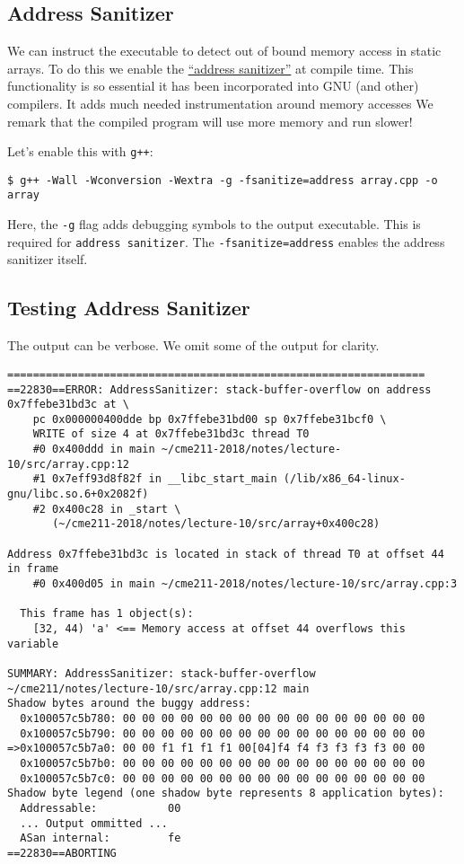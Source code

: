 \documentclass[12pt,letterpaper,twoside]{article}
\begin{document}
\subsection{Address Sanitizer}
We can instruct the executable to detect out of bound memory access in
static arrays. To do this we enable the
\href{https://en.wikipedia.org/wiki/AddressSanitizer}{``address
  sanitizer''} at compile time. This functionality is so essential it has been incorporated into GNU (and other) compilers.
It adds much needed instrumentation around memory accesses
We remark that the compiled program will use more memory and run slower!

Let's enable this with \texttt{g++}:

\begin{verbatim}
$ g++ -Wall -Wconversion -Wextra -g -fsanitize=address array.cpp -o array
\end{verbatim}
Here, the \texttt{-g} flag adds debugging symbols to the output
executable. This is required for \texttt{address sanitizer}.
The \texttt{-fsanitize=address} enables the address sanitizer itself.

\subsection{Testing Address Sanitizer}
The output can be verbose. We omit some of the output for clarity.

{\scriptsize
\begin{verbatim}
=================================================================
==22830==ERROR: AddressSanitizer: stack-buffer-overflow on address 0x7ffebe31bd3c at \
    pc 0x000000400dde bp 0x7ffebe31bd00 sp 0x7ffebe31bcf0 \
    WRITE of size 4 at 0x7ffebe31bd3c thread T0
    #0 0x400ddd in main ~/cme211-2018/notes/lecture-10/src/array.cpp:12
    #1 0x7eff93d8f82f in __libc_start_main (/lib/x86_64-linux-gnu/libc.so.6+0x2082f)
    #2 0x400c28 in _start \ 
       (~/cme211-2018/notes/lecture-10/src/array+0x400c28)

Address 0x7ffebe31bd3c is located in stack of thread T0 at offset 44 in frame
    #0 0x400d05 in main ~/cme211-2018/notes/lecture-10/src/array.cpp:3

  This frame has 1 object(s):
    [32, 44) 'a' <== Memory access at offset 44 overflows this variable

SUMMARY: AddressSanitizer: stack-buffer-overflow ~/cme211/notes/lecture-10/src/array.cpp:12 main
Shadow bytes around the buggy address:
  0x100057c5b780: 00 00 00 00 00 00 00 00 00 00 00 00 00 00 00 00
  0x100057c5b790: 00 00 00 00 00 00 00 00 00 00 00 00 00 00 00 00
=>0x100057c5b7a0: 00 00 f1 f1 f1 f1 00[04]f4 f4 f3 f3 f3 f3 00 00
  0x100057c5b7b0: 00 00 00 00 00 00 00 00 00 00 00 00 00 00 00 00
  0x100057c5b7c0: 00 00 00 00 00 00 00 00 00 00 00 00 00 00 00 00
Shadow byte legend (one shadow byte represents 8 application bytes):
  Addressable:           00
  ... Output ommitted ...
  ASan internal:         fe
==22830==ABORTING
\end{verbatim}
}
\end{document}

